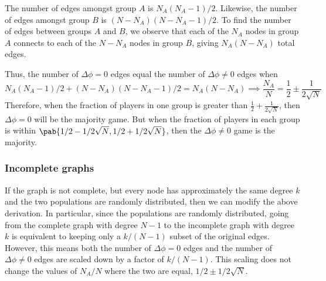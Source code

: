 The number of edges amongst group $A$ is $N_A (N_A - 1)/2$.
Likewise, the number of edges amongst group $B$ is
$(N-N_A) (N - N_A - 1)/2$.
To find the number of edges between groups $A$ and $B$,
we observe that each of the $N_A$ nodes in group $A$
connects to each of the $N - N_A$ nodes in group $B$,
giving $N_A (N - N_A)$ total edges.

Thus, the number of $\Delta \phi = 0$ edges
equal the number of $\Delta \phi \neq 0$ edges when
\begin{equation*}
  N_A (N_A - 1)/2 + (N - N_A) (N - N_A - 1)/2 = N_A (N - N_A)
  \implies \frac{N_A}{N} = \frac{1}{2} \pm \frac{1}{2 \sqrt{N}}
\end{equation*}
Therefore, when the fraction of players in one group is greater than
$\frac{1}{2} + \frac{1}{2\sqrt{N}}$,
then $\Delta \phi = 0$ will be the majority game.
But when the fraction of players in each group is within
$\pab{1/2 - 1/2\sqrt{N}, 1/2 + 1/2\sqrt{N}}$,
then the $\Delta \phi \neq 0$ game is the majority.

\subsubsection{Incomplete graphs}
\label{sec:two_unequal_groups_incomplete}
If the graph is not complete,
but every node has approximately the same degree $k$
and the two populations are randomly distributed,
then we can modify the above derivation.
In particular, since the populations are randomly distributed,
going from the complete graph with degree $N-1$
to the incomplete graph with degree $k$
is equivalent to keeping only a $k/(N-1)$ subset
of the original edges.
However, this means both the number of $\Delta \phi = 0$ edges
and the number of $\Delta \phi \neq 0$ edges
are scaled down by a factor of $k/(N-1)$.
This scaling does not change the values of $N_A/N$
where the two are equal, \ie $1/2 \pm 1/2\sqrt{N}$.
